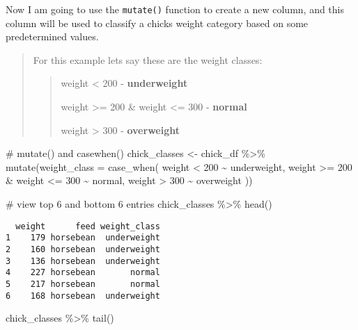 \documentclass[
  letterpaper,
  DIV=11,
  numbers=noendperiod]{scrreprt}
\newenvironment{Shaded}{\begin{snugshade}}{\end{snugshade}}
\newcommand{\AttributeTok}[1]{\textcolor[rgb]{0.40,0.45,0.13}{#1}}
\newcommand{\CommentTok}[1]{\textcolor[rgb]{0.37,0.37,0.37}{#1}}
\newcommand{\DecValTok}[1]{\textcolor[rgb]{0.68,0.00,0.00}{#1}}
\newcommand{\FunctionTok}[1]{\textcolor[rgb]{0.28,0.35,0.67}{#1}}
\newcommand{\NormalTok}[1]{\textcolor[rgb]{0.00,0.23,0.31}{#1}}
\newcommand{\OtherTok}[1]{\textcolor[rgb]{0.00,0.23,0.31}{#1}}
\newcommand{\SpecialCharTok}[1]{\textcolor[rgb]{0.37,0.37,0.37}{#1}}
\newcommand{\StringTok}[1]{\textcolor[rgb]{0.13,0.47,0.30}{#1}}
\begin{document}
Now I am going to use the \texttt{mutate()} function to create a new
column, and this column will be used to classify a chicks weight
category based on some predetermined values.

\begin{quote}
For this example lets say these are the weight classes:

\begin{quote}
weight \textless{} 200 - \textbf{underweight}

weight \textgreater= 200 \& weight \textless= 300 - \textbf{normal}

weight \textgreater{} 300 - \textbf{overweight}
\end{quote}
\end{quote}

\begin{Shaded}
\begin{Highlighting}[]
\CommentTok{\# mutate() and casewhen()}
\NormalTok{chick\_classes }\OtherTok{\textless{}{-}}\NormalTok{ chick\_df }\SpecialCharTok{\%\textgreater{}\%}
  \FunctionTok{mutate}\NormalTok{(}\AttributeTok{weight\_class =} \FunctionTok{case\_when}\NormalTok{(}
\NormalTok{    weight }\SpecialCharTok{\textless{}} \DecValTok{200} \SpecialCharTok{\textasciitilde{}} \StringTok{\textquotesingle{}underweight\textquotesingle{}}\NormalTok{,}
\NormalTok{    weight }\SpecialCharTok{\textgreater{}=} \DecValTok{200} \SpecialCharTok{\&}\NormalTok{ weight }\SpecialCharTok{\textless{}=} \DecValTok{300} \SpecialCharTok{\textasciitilde{}} \StringTok{\textquotesingle{}normal\textquotesingle{}}\NormalTok{,}
\NormalTok{    weight }\SpecialCharTok{\textgreater{}} \DecValTok{300} \SpecialCharTok{\textasciitilde{}} \StringTok{\textquotesingle{}overweight\textquotesingle{}}
\NormalTok{    ))}

\CommentTok{\# view top 6 and bottom 6 entries}
\NormalTok{chick\_classes }\SpecialCharTok{\%\textgreater{}\%} \FunctionTok{head}\NormalTok{()}
\end{Highlighting}
\end{Shaded}

\begin{verbatim}
  weight      feed weight_class
1    179 horsebean  underweight
2    160 horsebean  underweight
3    136 horsebean  underweight
4    227 horsebean       normal
5    217 horsebean       normal
6    168 horsebean  underweight
\end{verbatim}

\begin{Shaded}
\begin{Highlighting}[]
\NormalTok{chick\_classes }\SpecialCharTok{\%\textgreater{}\%} \FunctionTok{tail}\NormalTok{()}
\end{Highlighting}
\end{Shaded}
\end{document}
